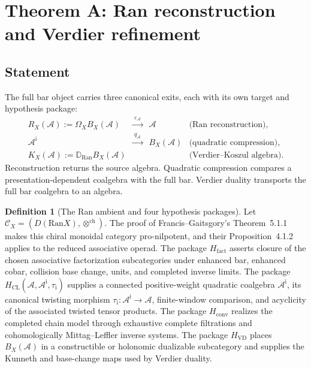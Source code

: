 \documentclass[11pt]{article}
\theoremstyle{plain}
\theoremstyle{definition}
\newtheorem{definition}[theorem]{Definition}
\theoremstyle{remark}
\newcommand{\Ran}{\mathrm{Ran}}
\newcommand{\cA}{\mathcal{A}}
\begin{document}

\section{Theorem A: Ran reconstruction and Verdier refinement}
\label{sec:theorem-A}

\subsection{Statement}

The full bar object carries three canonical exits, each with its own
target and hypothesis package:
\begin{equation}\label{eq:three-functors}
\begin{array}{lcll}
R_X(\cA):=\Omega_XB_X(\cA)&\xrightarrow{\ \varepsilon_\cA\ }&\cA
 &\text{(Ran reconstruction),}\\[3pt]
\cA^{\mathrm i}&\xrightarrow{\ q_\cA\ }&B_X(\cA)
 &\text{(quadratic compression),}\\[3pt]
K_X(\cA):=\mathbb D_{\Ran}B_X(\cA)
&&
 &\text{(Verdier--Koszul algebra).}
\end{array}
\end{equation}
Reconstruction returns the source algebra.  Quadratic compression
compares a presentation-dependent coalgebra with the full bar.
Verdier duality transports the full bar coalgebra to an algebra.

\begin{definition}[The Ran ambient and four hypothesis packages]
\label{def:A-bang-infty}
Let
$\mathcal C_X=(D(\Ran X),\otimes^{\mathrm{ch}})$.
The proof of Francis--Gaitsgory's Theorem~5.1.1 makes this chiral
monoidal category pro-nilpotent, and their Proposition~4.1.2 applies
to the reduced associative operad.  The package
$H_{\mathrm{fact}}$ asserts closure of
the chosen associative factorization subcategories under enhanced
bar, enhanced cobar, collision base change, units, and completed
inverse limits.  The package
$H_{\mathrm{CL}}(\cA,\cA^{\mathrm i},\tau_{\mathrm i})$ supplies a
connected positive-weight quadratic coalgebra $\cA^{\mathrm i}$,
its canonical twisting morphism
$\tau_{\mathrm i}\colon\cA^{\mathrm i}\to\cA$, finite-window
comparison, and acyclicity of the associated twisted tensor products.
The package $H_{\mathrm{conv}}$ realizes
the completed chain model through exhaustive complete filtrations
and cohomologically Mittag--Leffler inverse systems.  The package
$H_{\mathrm{VD}}$ places
$B_X(\cA)$ in a constructible or holonomic dualizable subcategory and
supplies the Kunneth and base-change maps used by Verdier duality.
\end{definition}
\end{document}
